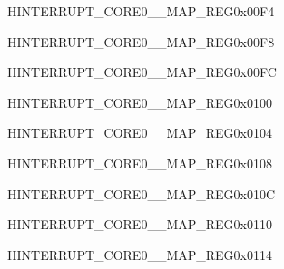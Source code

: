 \begin{register}{H}{INTERRUPT\_CORE0\_\_MAP\_REG}{0x00F4}\label{regdesc:INTERRUPTCORE0DCACHEPRELOADINTMAPREG}
\end{register}
\vspace{-3em}

\begin{register}{H}{INTERRUPT\_CORE0\_\_MAP\_REG}{0x00F8}\label{regdesc:INTERRUPTCORE0ICACHEPRELOADINTMAPREG}
\end{register}
\vspace{-3em}

\begin{register}{H}{INTERRUPT\_CORE0\_\_MAP\_REG}{0x00FC}\label{regdesc:INTERRUPTCORE0DCACHESYNCINTMAPREG}
\end{register}
\vspace{-3em}

\begin{register}{H}{INTERRUPT\_CORE0\_\_MAP\_REG}{0x0100}\label{regdesc:INTERRUPTCORE0ICACHESYNCINTMAPREG}
\end{register}
\vspace{-3em}

\begin{register}{H}{INTERRUPT\_CORE0\_\_MAP\_REG}{0x0104}\label{regdesc:INTERRUPTCORE0APBADCINTMAPREG}
\end{register}
\vspace{-3em}

\begin{register}{H}{INTERRUPT\_CORE0\_\_MAP\_REG}{0x0108}\label{regdesc:INTERRUPTCORE0DMACH0INTMAPREG}
\end{register}
\vspace{-3em}

\begin{register}{H}{INTERRUPT\_CORE0\_\_MAP\_REG}{0x010C}\label{regdesc:INTERRUPTCORE0DMACH1INTMAPREG}
\end{register}
\vspace{-3em}

\begin{register}{H}{INTERRUPT\_CORE0\_\_MAP\_REG}{0x0110}\label{regdesc:INTERRUPTCORE0DMACH2INTMAPREG}
\end{register}
\vspace{-3em}

\begin{register}{H}{INTERRUPT\_CORE0\_\_MAP\_REG}{0x0114}\label{regdesc:INTERRUPTCORE0DMACH3INTMAPREG}
\end{register}
\vspace{-3em}

